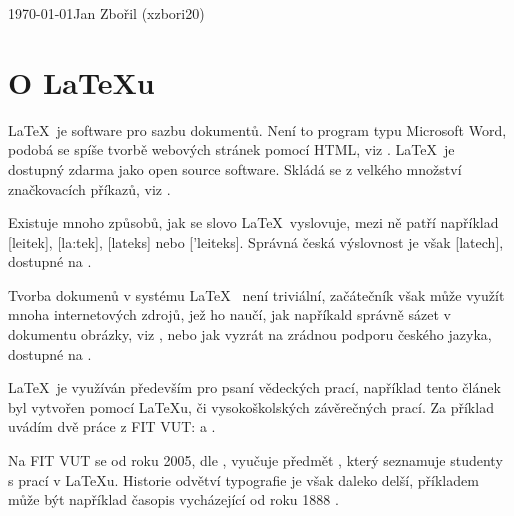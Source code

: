 \documentclass[a4paper,11pt,times]{article}
\begin{document}
\begin{titlepage}
\begin{justify}
\Huge

\end{justify}
\begin{center}
\large
\textbf{}
\end{center}

\Large
{\LARGE \today \hfill Jan Zbořil (xzbori20)}
\end{titlepage}

\section*{O \LaTeX u}
\LaTeX~je software pro sazbu dokumentů. Není to program typu Microsoft Word, podobá se spíše tvorbě webových stránek pomocí HTML, viz \cite{KottwitzLatexBegginersGuide}. \LaTeX~je dostupný zdarma jako open source software. Skládá se z velkého množství značkovacích příkazů, viz \cite{KopkaGuideToLatex}.

Existuje mnoho způsobů, jak se slovo \LaTeX~vyslovuje, mezi ně patří například [leitek], [la:tek], [lateks] nebo ['leiteks]. Správná česká výslovnost je však [latech], dostupné na \cite{wiki:Latex}.

Tvorba dokumenů v systému \LaTeX~ není triviální, začátečník však může využít mnoha internetových zdrojů, jež ho naučí, jak napříkald správně sázet v dokumentu obrázky, viz \cite{MartinekObrazky}, nebo jak vyzrát na zrádnou podporu českého jazyka, dostupné na \cite{MartinekCestina}.

\LaTeX~je využíván především pro psaní vědeckých prací, například tento článek \cite{LatexClanek} byl vytvořen pomocí \LaTeX u, či vysokoškolských závěrečných prací. Za příklad uvádím dvě práce z FIT VUT: \cite{FIT1} a \cite{FIT2}.

Na FIT VUT se od roku 2005, dle \cite{FITPUB8568}, vyučuje předmět , který seznamuje studenty s prací v \LaTeX u. Historie odvětví typografie je však daleko delší, příkladem může být například  časopis  vycházející od roku 1888 \cite{Typografia}.

\newpage



\end{document}
